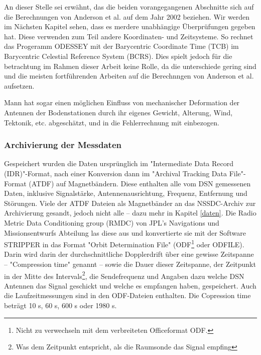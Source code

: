 An dieser Stelle sei erwähnt, das die beiden vorangegangenen Abschnitte sich auf die Berechnungen von Anderson et al. auf dem Jahr 2002 beziehen.
Wir werden im Nächsten Kapitel sehen, dass es merdere unabhängige Überprüfungen gegeben hat.
Diese verwenden zum Teil andere Koordinaten- und Zeitsysteme.
So rechnet das Progeramm ODESSEY mit der Barycentric Coordinate Time (TCB) im Barycentric Celestial Reference System (BCRS).
Dies spielt jedoch für die betrachtung im Rahmen dieser Arbeit keine Rolle, da die unterschiede gering sind und die meisten fortführenden Arbeiten auf die Berechnngen von Anderson et al. aufsetzen.	%

Mann hat sogar einen möglichen Einfluss von mechanischer Deformation der Antennen der Bodenstationen durch ihr eigenes Gewicht,
Alterung, Wind, Tektonik, etc. abgeschätzt, und in die Fehlerrechnung mit einbezogen.\cite{Dittus2006} %


\subsubsection{Archivierung der Messdaten}

Gespeichert wurden die Daten ursprünglich im "Intermediate Data Record (IDR)"-Format, nach einer Konversion dann im "Archival Tracking Data File"-Format (ATDF) auf Magnetbändern. Diese enthalten alle vom DSN gemessenen Daten, inklusive Signalstärke, Antennenausrichtung, Frequenz, Entfernung und Störungen.\cite{Turyshev2010} %
Viele der ATDF Dateien als Magnetbänder an das NSSDC-Archiv zur Archivierung gesandt, jedoch nicht alle – dazu mehr in Kapitel \ref{daten}.\cite{Markwardt2002}
Die Radio Metric Data Conditioning group (RMDC) von JPL's Navigations und Missionsentwurfs Abteilung las diese aus und konvertierte sie mit der Software STRIPPER in das Format "Orbit Determination File" (ODF\footnote{Nicht zu verwechseln mit dem verbreiteten Officeformat ODF.} oder ODFILE).
Darin wird darin der durchschnittliche Dopplerdrift über eine gewisse Zeitspanne
– "Compression time" genannt – sowie die Dauer dieser Zeitspanne, der Zeitpunkt in der Mitte des Intervals\footnote{Was dem Zeitpunkt entspricht, als die Raumsonde das Signal empfing\cite{Levy2008}}, die Sendefrequenz und
Angaben dazu welche DSN Antennen das Signal geschickt und welche es empfangen haben, gespeichert.\cite{Levy2008}
Auch die Laufzeitmessungen sind in den ODF-Dateien enthalten.\cite{Anderson2002}
Die Copression time beträgt 10 s, 60 s, 600 s oder 1980 s.\cite{Anderson2002} %

